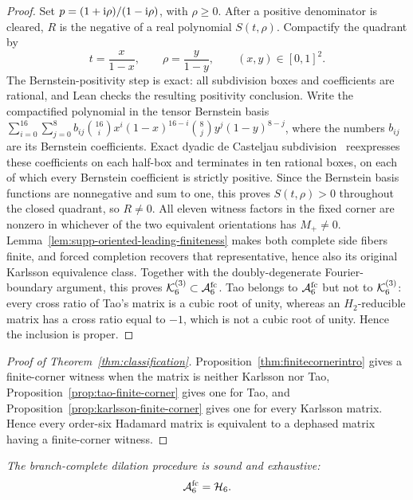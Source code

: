 \begin{proof}
Set $p=(1+\mathrm i\rho)/(1-\mathrm i\rho)$, with $\rho\geq0$.  After a positive denominator is cleared, $R$ is the negative of a real polynomial $S(t,\rho)$.  Compactify the quadrant by
\begin{equation}
t=\frac{x}{1-x},\qquad \rho=\frac{y}{1-y},
\qquad (x,y)\in[0,1]^2.
\label{eq:supp-karlsson-compactification}
\end{equation}
{The Bernstein-positivity step is exact: all subdivision boxes and coefficients are rational, and Lean checks the resulting positivity conclusion.}
Write the compactified polynomial in the tensor Bernstein basis $\sum_{i=0}^{16}\sum_{j=0}^{8}b_{ij} \binom{16}{i}x^i(1-x)^{16-i} \binom{8}{j}y^j(1-y)^{8-j}$, where the numbers $b_{ij}$ are its Bernstein coefficients. Exact dyadic de Casteljau subdivision~\cite{Farouki2012} reexpresses these coefficients on each half-box and terminates in ten rational boxes, on each of which every Bernstein coefficient is strictly positive.  Since the Bernstein basis functions are nonnegative and sum to one, this proves $S(t,\rho)>0$ throughout the closed quadrant, so $R\neq0$. All eleven witness factors in the fixed corner are nonzero in whichever of the two equivalent orientations has $M_+\ne0$. Lemma~\ref{lem:supp-oriented-leading-finiteness} makes both complete side fibers finite, and forced completion recovers that representative, hence also its original Karlsson equivalence class. Together with the doubly-degenerate Fourier-boundary argument, this proves $\mathcal K_6^{(3)}\subset\mathcal A_6^{\mathrm{fc}}$. Tao belongs to $\mathcal A_6^{\mathrm{fc}}$ but not to $\mathcal K_6^{(3)}$: every cross ratio of Tao's matrix is a cubic root of unity, whereas an $H_2$-reducible matrix has a cross ratio equal to $-1$, which is not a cubic root of unity. Hence the inclusion is proper.
\end{proof}

\begin{proof}[Proof of Theorem~\ref{thm:classification}]
{Proposition~\ref{thm:finitecornerintro} gives a finite-corner witness when the matrix is neither Karlsson nor Tao, Proposition~\ref{prop:tao-finite-corner} gives one for Tao, and Proposition~\ref{prop:karlsson-finite-corner} gives one for every Karlsson matrix. Hence every order-six Hadamard matrix is equivalent to a dephased matrix having a finite-corner witness.}
\end{proof}

{\emph{The branch-complete dilation procedure is sound and exhaustive:}}
\begin{equation}
{\mathcal A_6^{\mathrm{fc}}=\mathcal H_6.}
\label{eq:supp-complete-classification}
\end{equation}

